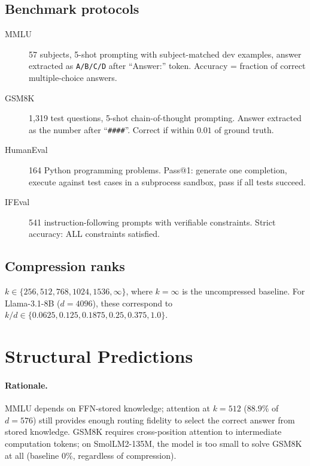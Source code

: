 \documentclass[11pt]{article}
\begin{document}
\subsection{Benchmark protocols}

\begin{description}
\item[MMLU] 57 subjects, 5-shot prompting with subject-matched dev
      examples, answer extracted as \texttt{A/B/C/D} after ``Answer:''
      token.  Accuracy = fraction of correct multiple-choice answers.

\item[GSM8K] 1,319 test questions, 5-shot chain-of-thought prompting.
      Answer extracted as the number after ``\texttt{\#\#\#\#}''.
      Correct if within $0.01$ of ground truth.

\item[HumanEval] 164 Python programming problems.  Pass@1: generate one
      completion, execute against test cases in a subprocess sandbox,
      pass if all tests succeed.

\item[IFEval] 541 instruction-following prompts with verifiable
      constraints.  Strict accuracy: ALL constraints satisfied.
\end{description}

\subsection{Compression ranks}
$k\in\{256,512,768,1024,1536,\infty\}$, where $k{=}\infty$ is the
uncompressed baseline.  For Llama-3.1-8B ($d{=}4096$), these correspond
to $k/d\in\{0.0625,0.125,0.1875,0.25,0.375,1.0\}$.

\section{Structural Predictions}
\label{sec:predictions}

\paragraph{Rationale.}  MMLU depends on FFN-stored knowledge; attention
at $k{=}512$ ($88.9\%$ of $d{=}576$) still provides enough routing fidelity
to select the correct answer from stored knowledge.  GSM8K requires
cross-position attention to intermediate computation tokens; on
SmolLM2-135M, the model is too small to solve GSM8K at all
(baseline $0\%$, regardless of compression).
\end{document}
